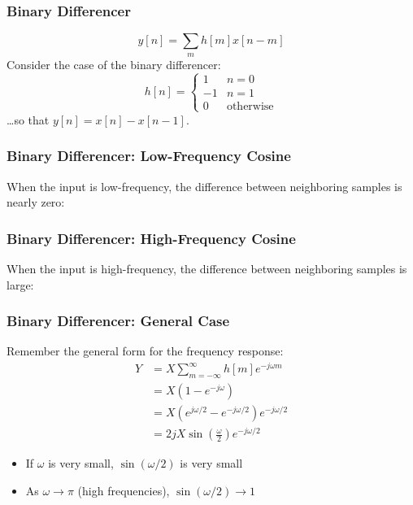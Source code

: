 \documentclass{beamer}
\begin{document}
\begin{frame}
  \frametitle{Binary Differencer}

  \begin{displaymath}
    y[n]=\sum_m h[m]x[n-m]
  \end{displaymath}
  Consider the case of the binary differencer:
  \begin{displaymath}
    h[n]=\left\{\begin{array}{ll}
    1 & n=0\\
    -1 & n=1\\
    0 & \mbox{otherwise}
    \end{array}\right.
  \end{displaymath}
  \ldots so that $y[n]=x[n]-x[n-1]$.
\end{frame}

\begin{frame}
  \frametitle{Binary Differencer: Low-Frequency Cosine}

  When the input is low-frequency, the difference between neighboring
  samples is nearly zero:
  \centerline{}
\end{frame}

\begin{frame}
  \frametitle{Binary Differencer: High-Frequency Cosine}

  When the input is high-frequency, the difference between neighboring
  samples is large:
  \centerline{}
\end{frame}

\begin{frame}
  \frametitle{Binary Differencer: General Case}

  Remember the general form for the frequency response:
  \begin{align*}
    Y &= X\sum_{m=-\infty}^\infty h[m]e^{-j\omega m}\\
    &= X\left(1-e^{-j\omega}\right)\\
    &= X\left(e^{j\omega/2}-e^{-j\omega/2}\right)e^{-j\omega/2}\\
    &= 2jX\sin\left(\frac{\omega}{2}\right)e^{-j\omega/2}
  \end{align*}
  \begin{itemize}
  \item If $\omega$ is very small, $\sin(\omega/2)$ is very small
  \item As $\omega\rightarrow\pi$ (high frequencies), $\sin(\omega/2)\rightarrow 1$
  \end{itemize}
\end{frame}
\end{document}
